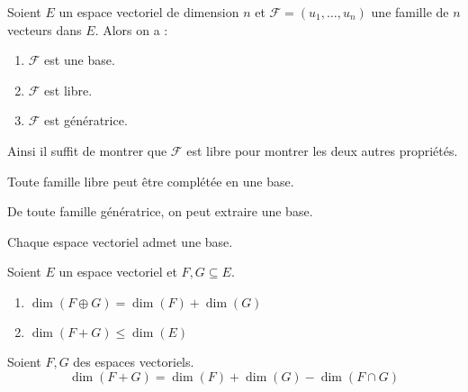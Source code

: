 \begin{proposition}
	Soient $E$ un espace vectoriel de dimension $n$ et $\mathcal{F} = (u_1, \ldots, u_n)$ une famille de $n$ vecteurs dans $E$. Alors on a :
	\begin{multicols}{3}
	    \begin{enumerate}
		\item $\mathcal{F}$ est une base.
		\item $\mathcal{F}$ est libre.
		\item $\mathcal{F}$ est génératrice.
	\end{enumerate}
	\end{multicols}
	\noindent Ainsi il suffit de montrer que $\mathcal{F}$ est libre pour montrer les deux autres propriétés.
\end{proposition}

\begin{theorem}
	Toute famille libre peut être complétée en une base.
\end{theorem}

\begin{theorem}
    De toute famille génératrice, on peut extraire une base.
\end{theorem}

\begin{theorem}
    Chaque espace vectoriel admet une base.
\end{theorem}

\begin{proposition}
	Soient $E$ un espace vectoriel et $F, G\subseteq E$.
	\begin{multicols}{2}
	    \begin{enumerate}
    		\item $\dim(F \oplus G) = \dim(F) + \dim(G)$ 
    		\item $\dim(F + G) \leq \dim(E)$
    	\end{enumerate}
	\end{multicols}
\end{proposition}

\begin{theorem}
	Soient $F, G$ des espaces vectoriels.
	\[ \dim(F+G) = \dim(F) + \dim(G) - \dim(F\cap G) \]
\end{theorem}

